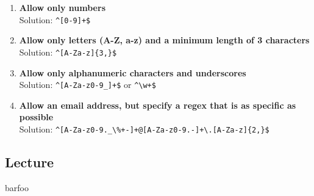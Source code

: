\begin{enumerate}
    \item \textbf{Allow only numbers} \\
    Solution: \verb|^[0-9]+$|
    
    \item \textbf{Allow only letters (A-Z, a-z) and a minimum length of 3 characters} \\
    Solution: \verb|^[A-Za-z]{3,}$|
    
    \item \textbf{Allow only alphanumeric characters and underscores} \\
    Solution: \verb|^[A-Za-z0-9_]+$| or \verb|^\w+$|
    
    \item \textbf{Allow an email address, but specify a regex that is as specific as possible} \\
    Solution: \verb|^[A-Za-z0-9._\%+-]+@[A-Za-z0-9.-]+\.[A-Za-z]{2,}$|
\end{enumerate}


\subsection{Lecture}
barfoo
